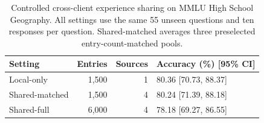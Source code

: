 \begin{table}[t]
    \centering
    \caption{Controlled cross-client experience sharing on MMLU High School Geography.
    All settings use the same 55 unseen questions and ten responses per question.
    Shared-matched averages three preselected entry-count-matched pools.}
    \label{tab:collaborative_sharing}
    \footnotesize
    \setlength{\tabcolsep}{3pt}
    \renewcommand{\arraystretch}{1.1}
    \begin{tabular}{lrrl}
        \hline
        Setting & Entries & Sources & Accuracy (\%) [95\% CI] \\
        \hline
        Local-only & 1,500 & 1 & 80.36 [70.73, 88.37] \\
        Shared-matched & 1,500 & 4 & 80.24 [71.39, 88.18] \\
        Shared-full & 6,000 & 4 & 78.18 [69.27, 86.55] \\
        \hline
    \end{tabular}
\end{table}
